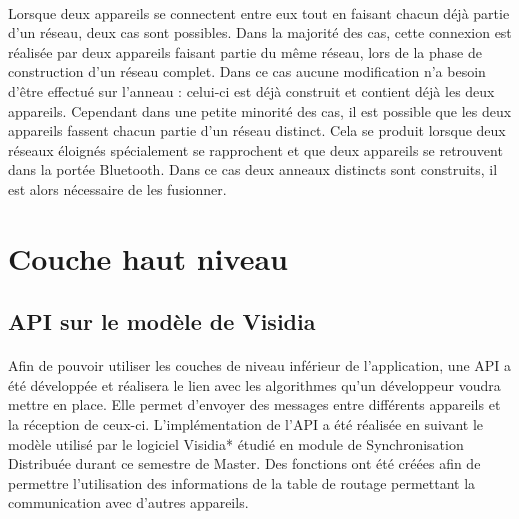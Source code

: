 \documentclass[a4paper,10pt]{report}
\begin{document}
      \paragraph{}
      Lorsque deux appareils se connectent entre eux tout en faisant chacun déjà partie d'un réseau, deux cas sont possibles. Dans la majorité des cas, cette connexion est réalisée par deux appareils faisant partie du même réseau, lors de la phase de construction d'un réseau complet. Dans ce cas aucune modification n'a besoin d'être effectué sur l'anneau : celui-ci est déjà construit et contient déjà les deux appareils. Cependant dans une petite minorité des cas, il est possible que les deux appareils fassent chacun partie d'un réseau distinct. Cela se produit lorsque deux réseaux éloignés spécialement se rapprochent et que deux appareils se retrouvent dans la portée Bluetooth. Dans ce cas deux anneaux distincts sont construits, il est alors nécessaire de les fusionner. 
      
  \section{Couche haut niveau}
    \subsection{API sur le modèle de Visidia}
    \paragraph{}
    Afin de pouvoir utiliser les couches de niveau inférieur de l'application, une API a été développée et réalisera le lien avec les algorithmes qu'un développeur voudra mettre en place.
    Elle permet d'envoyer des messages entre différents appareils et la réception de ceux-ci. L'implémentation de l'API a été réalisée en suivant le modèle utilisé par le logiciel Visidia* étudié en module de Synchronisation Distribuée durant ce semestre de Master. Des fonctions ont été créées afin de permettre l'utilisation des informations de la table de routage permettant la communication avec d'autres appareils.
    
\end{document}
